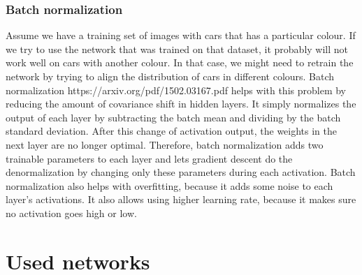 \documentclass[twoside]{ctuthesis}
\theoremstyle{plain}
\theoremstyle{definition}
\theoremstyle{note}
\begin{document}
\subsection{Batch normalization}
Assume we have a training set of images with cars that has a particular colour. If we try to use the network that was trained on that dataset, it probably will not work well on cars with another colour. In that case, we might need to retrain the network by trying to align the distribution of cars in different colours. Batch normalization https://arxiv.org/pdf/1502.03167.pdf  helps with this problem by reducing the amount of covariance shift in hidden layers. It simply normalizes the output of each layer by subtracting the batch mean and dividing by the batch standard deviation.
After this change of activation output, the weights in the next layer are no longer optimal. Therefore, batch normalization adds two trainable parameters to each layer and lets gradient descent do the denormalization by changing only these parameters during each activation. 
Batch normalization also helps with overfitting, because it adds some noise to each layer's activations. It also allows using higher learning rate, because it makes sure no activation goes high or low. 
\chapter{Used networks}
\end{document}
